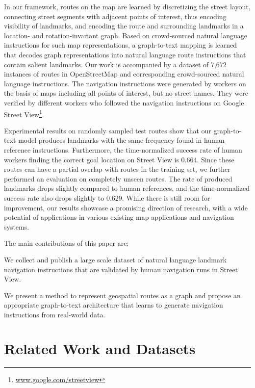\documentclass[11pt,a4paper]{article}
\begin{document}
In our framework, routes on the map are learned by discretizing the street layout, connecting street segments with adjacent points of interest, thus encoding visibility of landmarks, and encoding the route and surrounding landmarks in a location- and rotation-invariant graph. Based on crowd-sourced natural language instructions for such map representations, a graph-to-text mapping is learned that decodes graph representations into natural language route instructions that contain salient landmarks.
Our work is accompanied by a dataset of 7,672 instances of routes in OpenStreetMap and corresponding crowd-sourced natural language instructions. The navigation instructions were generated by workers on the basis of maps including all points of interest, but no street names. They were verified by different workers who followed the navigation instructions on Google Street View\footnote{\url{www.google.com/streetview}}.

Experimental results on randomly sampled test routes show that our graph-to-text model produces landmarks with the same frequency found in human reference instructions. Furthermore, the time-normalized success rate of human workers finding the correct goal location on Street View is 0.664. Since these routes can have a partial overlap with routes in the training set, we further performed an evaluation on completely unseen routes. The rate of produced landmarks drops slightly compared to human references, and the time-normalized success rate also drops slightly to 0.629. While there is still room for improvement, our results showcase a promising direction of research, with a wide potential of applications in various existing map applications and navigation systems.


The main contributions of this paper are:
\begin{compactitem}[$\bullet$]
\item We collect and publish a large scale dataset of natural language landmark navigation instructions that are validated by human navigation runs in Street View.
\item We present a method to represent geospatial routes as a graph and propose an appropriate graph-to-text architecture that learns to generate navigation instructions from real-world data.
\end{compactitem}

\section{Related Work and Datasets}
\end{document}
